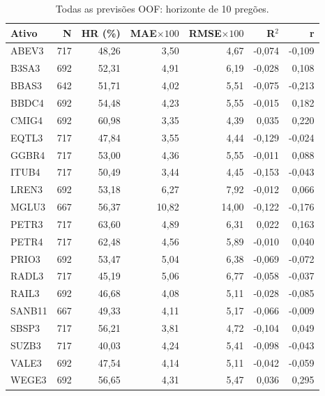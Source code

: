 \begin{table}[H]\centering
\caption{Todas as previsões OOF: horizonte de 10 pregões.}
{\footnotesize\begin{tabular}{lrrrrrr}\hline
Ativo & N & HR (\%) & MAE$\times100$ & RMSE$\times100$ & R$^2$ & r\\ \hline
ABEV3 & 717 & 48,26 & 3,50 & 4,67 & -0,074 & -0,109\\
B3SA3 & 692 & 52,31 & 4,91 & 6,19 & -0,028 & 0,108\\
BBAS3 & 642 & 51,71 & 4,02 & 5,51 & -0,075 & -0,213\\
BBDC4 & 692 & 54,48 & 4,23 & 5,55 & -0,015 & 0,182\\
CMIG4 & 692 & 60,98 & 3,35 & 4,39 & 0,035 & 0,220\\
EQTL3 & 717 & 47,84 & 3,55 & 4,44 & -0,129 & -0,024\\
GGBR4 & 717 & 53,00 & 4,36 & 5,55 & -0,011 & 0,088\\
ITUB4 & 717 & 50,49 & 3,44 & 4,45 & -0,153 & -0,043\\
LREN3 & 692 & 53,18 & 6,27 & 7,92 & -0,012 & 0,066\\
MGLU3 & 667 & 56,37 & 10,82 & 14,00 & -0,122 & -0,176\\
PETR3 & 717 & 63,60 & 4,89 & 6,31 & 0,022 & 0,163\\
PETR4 & 717 & 62,48 & 4,56 & 5,89 & -0,010 & 0,040\\
PRIO3 & 692 & 53,47 & 5,04 & 6,38 & -0,069 & -0,072\\
RADL3 & 717 & 45,19 & 5,06 & 6,77 & -0,058 & -0,037\\
RAIL3 & 692 & 46,68 & 4,08 & 5,11 & -0,028 & -0,085\\
SANB11 & 667 & 49,33 & 4,11 & 5,17 & -0,066 & -0,009\\
SBSP3 & 717 & 56,21 & 3,81 & 4,72 & -0,104 & 0,049\\
SUZB3 & 717 & 40,03 & 4,24 & 5,41 & -0,098 & -0,043\\
VALE3 & 692 & 47,54 & 4,14 & 5,11 & -0,042 & -0,059\\
WEGE3 & 692 & 56,65 & 4,31 & 5,47 & 0,036 & 0,295\\
\hline\end{tabular}}\par{}\end{table}

